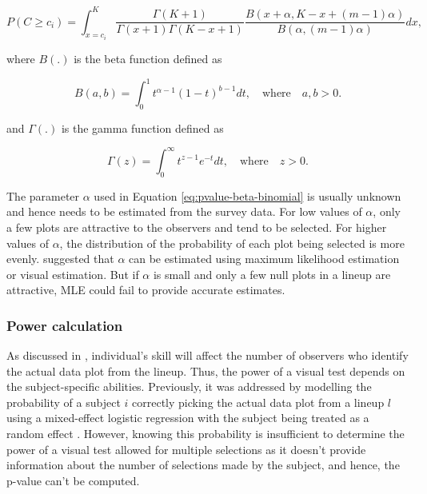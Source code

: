 \documentclass[]{interact}
\theoremstyle{plain}%
\theoremstyle{definition}
\theoremstyle{remark}
\begin{document}
\begin{equation} \label{eq:pvalue-beta-binomial}
P(C \geq c_i) = \int_{x=c_i}^{K}\frac{\Gamma(K + 1)}{\Gamma(x + 1)\Gamma(K - x + 1)}\frac{B(x + \alpha, K - x + (m - 1)\alpha)}{B(\alpha, (m-1)\alpha)}dx,
\end{equation}

where \(B(.)\) is the beta function defined as

\begin{equation} \label{eq:betafunction}
B(a, b) = \int_{0}^{1}t^{\alpha - 1}(1-t)^{b-1}dt,\quad \text{where}\quad a,b>0. 
\end{equation}

and \(\Gamma(.)\) is the gamma function defined as

\begin{equation} \label{eq:gammafunction}
\Gamma(z) = \int_{0}^{\infty}t^{z - 1}e^{-t}dt,\quad \text{where}\quad z>0. 
\end{equation}

The parameter \(\alpha\) used in Equation \ref{eq:pvalue-beta-binomial}
is usually unknown and hence needs to be estimated from the survey data.
For low values of \(\alpha\), only a few plots are attractive to the
observers and tend to be selected. For higher values of \(\alpha\), the
distribution of the probability of each plot being selected is more
evenly. \citet{vanderplas2021statistical} suggested that \(\alpha\) can
be estimated using maximum likelihood estimation or visual estimation.
But if \(\alpha\) is small and only a few null plots in a lineup are
attractive, MLE could fail to provide accurate estimates.

\hypertarget{power-calculation}{%
\subsubsection{Power calculation}\label{power-calculation}}

As discussed in \citet{majumder_validation_2013}, individual's skill
will affect the number of observers who identify the actual data plot
from the lineup. Thus, the power of a visual test depends on the
subject-specific abilities. Previously, it was addressed by modelling
the probability of a subject \(i\) correctly picking the actual data
plot from a lineup \(l\) using a mixed-effect logistic regression with
the subject being treated as a random effect
\citep{majumder_validation_2013}. However, knowing this probability is
insufficient to determine the power of a visual test allowed for
multiple selections as it doesn't provide information about the number
of selections made by the subject, and hence, the p-value can't be
computed.
\end{document}
